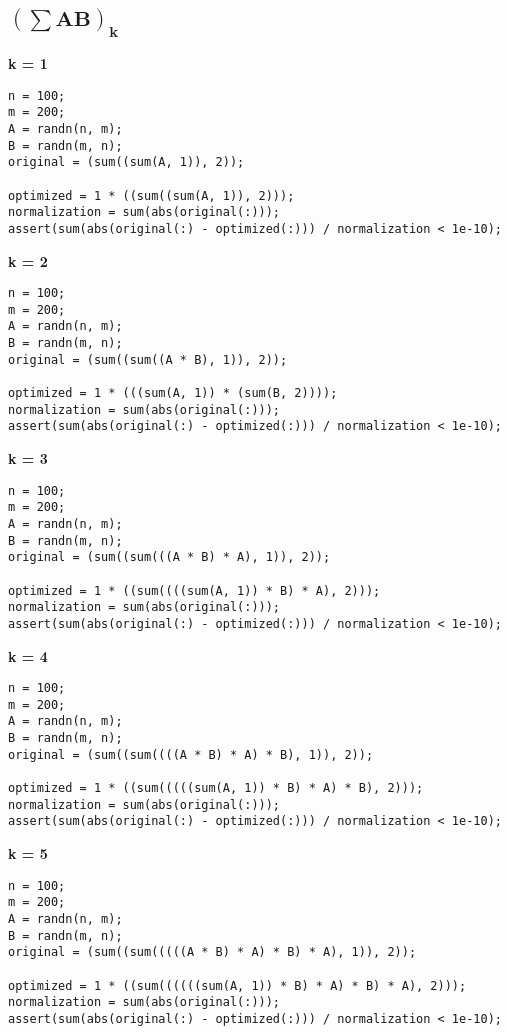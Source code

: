 \subsection{$\mathbf{(\sum AB)_k}$}



{\bf k = 1}

\begin{lstlisting}
n = 100;
m = 200;
A = randn(n, m);
B = randn(m, n);
original = (sum((sum(A, 1)), 2));

optimized = 1 * ((sum((sum(A, 1)), 2)));
normalization = sum(abs(original(:)));
assert(sum(abs(original(:) - optimized(:))) / normalization < 1e-10);
\end{lstlisting}


{\bf k = 2}

\begin{lstlisting}
n = 100;
m = 200;
A = randn(n, m);
B = randn(m, n);
original = (sum((sum((A * B), 1)), 2));

optimized = 1 * (((sum(A, 1)) * (sum(B, 2))));
normalization = sum(abs(original(:)));
assert(sum(abs(original(:) - optimized(:))) / normalization < 1e-10);
\end{lstlisting}


{\bf k = 3}

\begin{lstlisting}
n = 100;
m = 200;
A = randn(n, m);
B = randn(m, n);
original = (sum((sum(((A * B) * A), 1)), 2));

optimized = 1 * ((sum((((sum(A, 1)) * B) * A), 2)));
normalization = sum(abs(original(:)));
assert(sum(abs(original(:) - optimized(:))) / normalization < 1e-10);
\end{lstlisting}


{\bf k = 4}

\begin{lstlisting}
n = 100;
m = 200;
A = randn(n, m);
B = randn(m, n);
original = (sum((sum((((A * B) * A) * B), 1)), 2));

optimized = 1 * ((sum(((((sum(A, 1)) * B) * A) * B), 2)));
normalization = sum(abs(original(:)));
assert(sum(abs(original(:) - optimized(:))) / normalization < 1e-10);
\end{lstlisting}


{\bf k = 5}

\begin{lstlisting}
n = 100;
m = 200;
A = randn(n, m);
B = randn(m, n);
original = (sum((sum(((((A * B) * A) * B) * A), 1)), 2));

optimized = 1 * ((sum((((((sum(A, 1)) * B) * A) * B) * A), 2)));
normalization = sum(abs(original(:)));
assert(sum(abs(original(:) - optimized(:))) / normalization < 1e-10);
\end{lstlisting}


